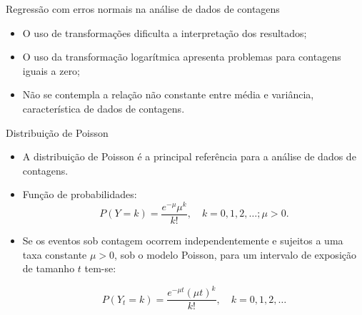 \documentclass[10pt, aspectratio=169]{beamer}\usepackage[]{graphicx}\usepackage[]{color}
\begin{document}
\begin{frame}{Regressão com erros normais na análise de dados de contagens}
     \vspace{0,2cm}
 
    \begin{itemize}
        \item O uso de transformações dificulta a interpretação dos 
        resultados;
        \vspace{0,5cm}
        \item O uso da transformação logarítmica apresenta problemas 
        para contagens iguais a zero;
        \vspace{0,5cm}
        \item Não se contempla a relação não constante entre média e 
        variância, característica de dados de contagens.
    \end{itemize}

\end{frame}

\begin{frame}{Distribuição de Poisson}

    \begin{itemize}
        \item A distribuição de Poisson é a principal referência para 
        a análise de dados de contagens.
    \vspace{0,3cm}
        \item Função de probabilidades:
$$
P\left (Y=k \right )=\frac{e^{-\mu}\mu^{k}}{k!},\quad k = 0, 1, 2, \ldots; \mu>0.
$$
   \vspace{0,2cm}
       \item Se os eventos sob contagem  ocorrem independentemente e 
       sujeitos a uma taxa constante $\mu >0$, sob o modelo Poisson,  
       para um intervalo de exposição de tamanho $t$ tem-se:

$$
    P\left ( Y_t = k \right)=\frac{e^{-\mu t}(\mu t)^{k}}{k!}, \quad k = 0,1,2,\ldots
$$
        \end{itemize}

\end{frame}
\end{document}
